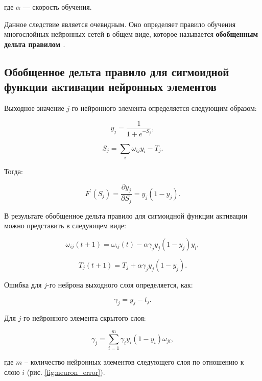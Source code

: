 где $\alpha$ — скорость обучения.

Данное следствие является очевидным. Оно определяет правило обучения многослойных нейронных сетей в общем виде, которое называется \textbf{обобщенным дельта правилом \cite{Golovko_2001}}.

\subsection{Обобщенное дельта правило для сигмоидной функции активации нейронных элементов}

Выходное значение $j$-го нейронного элемента определяется следующим образом:

\begin{equation}
    y_j = \frac{1}{1 + e^{-S_j}},
\end{equation}

\begin{equation}
    S_j = \sum_{i} {\omega_{i j} y_i - T_j}.
\end{equation}

Тогда:

\begin{equation}
    F^\prime(S_j) = \frac{\partial y_j}{\partial S_j} = y_j(1 - y_j).
\end{equation}

В результате обобщенное дельта правило для сигмоидной функции активации можно представить в следующем виде:

\begin{equation}
    \omega_{i j}(t + 1) = \omega_{i j}(t) - \alpha\gamma_j y_j (1 - y_j) y_i,
\end{equation}

\begin{equation}
    T_j(t + 1) = T_j + \alpha\gamma_j y_j(1 - y_j).
\end{equation}

Ошибка для $j$-го нейрона выходного слоя определяется, как:

\begin{equation}
    \gamma_j = y_j - t_j.
\end{equation}

Для $j$-го нейронного элемента скрытого слоя:

\begin{equation}
    \gamma_j = \sum_{i = 1}^{m}{\gamma_i y_i(1 - y_i)\omega_{j i},}
\end{equation}

где $m$ – количество нейронных элементов следующего слоя по отношению к слою $i$ (рис. \ref{fig:neuron_error}).

